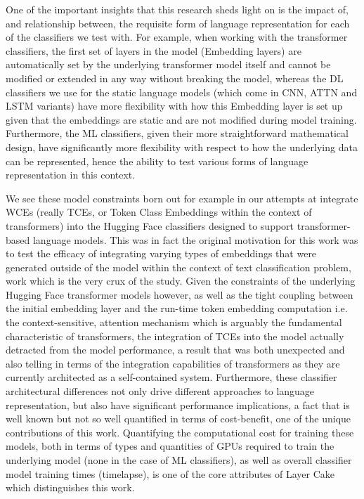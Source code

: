 \documentclass[final]{clv2025}
\begin{document}
One of the important insights that this research sheds light on is the impact of, and relationship between, the requisite form of language representation for each of the classifiers we test with. For example, when working with the transformer classifiers, the first set of layers in the model (Embedding layers) are automatically set by the underlying transformer model itself and cannot be modified or extended in any way without breaking the model, whereas the DL classifiers we use for the static language models (which come in CNN, ATTN and LSTM variants) have more flexibility with how this Embedding layer is set up given that the embeddings are static and are not modified during model training. Furthermore, the ML classifiers, given their more straightforward mathematical design, have significantly more flexibility with respect to how the underlying data can be represented, hence the ability to test various forms of language representation in this context. 

We see these model constraints born out for example in our attempts at integrate WCEs (really TCEs, or Token Class Embeddings within the context of transformers) into the Hugging Face classifiers designed to support transformer-based language models. This was in fact the original motivation for this work was to test the efficacy of integrating varying types of embeddings that were generated outside of the model within the context of text classification problem, work which is the very crux of the \cite{moreo2021} study. Given the constraints of the underlying Hugging Face transformer models however, as well as the tight coupling between the initial embedding layer and the run-time token embedding computation i.e. the context-sensitive, attention mechanism which is arguably the fundamental characteristic of transformers, the integration of TCEs into the model actually detracted from the model performance, a result that was both unexpected and also telling in terms of the integration capabilities of transformers as they are currently architected as a self-contained system. Furthermore, these classifier architectural differences not only drive different approaches to language representation, but also have significant performance implications, a fact that is well known but not so well quantified in terms of cost-benefit, one of the unique contributions of this work. Quantifying the computational cost for training these models, both in terms of types and quantities of GPUs required to train the underlying model (none in the case of ML classifiers), as well as overall classifier model training times (timelapse), is one of the core attributes of Layer Cake which distinguishes this work.
\end{document}
